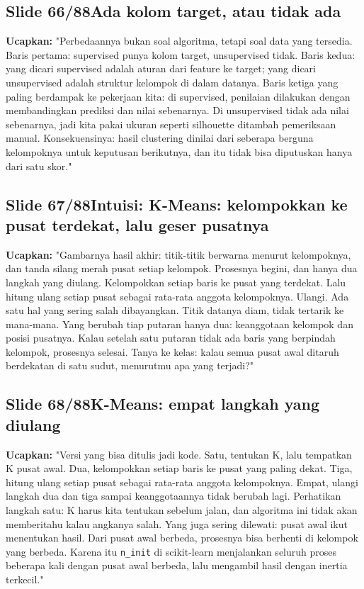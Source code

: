 \documentclass[11pt]{article}
\renewcommand{\framebox}[1]{\colorbox{acc!15}{\textcolor{acc}{\textbf{#1}}}}
\begin{document}
\subsection*{\framebox{Slide 66/88}\quad Ada kolom target, atau tidak ada}
\textbf{Ucapkan:} "Perbedaannya bukan soal algoritma, tetapi soal data yang tersedia. Baris pertama: supervised punya kolom target, unsupervised tidak. Baris kedua: yang dicari supervised adalah aturan dari feature ke target; yang dicari unsupervised adalah struktur kelompok di dalam datanya. Baris ketiga yang paling berdampak ke pekerjaan kita: di supervised, penilaian dilakukan dengan membandingkan prediksi dan nilai sebenarnya. Di unsupervised tidak ada nilai sebenarnya, jadi kita pakai ukuran seperti silhouette ditambah pemeriksaan manual. Konsekuensinya: hasil clustering dinilai dari seberapa berguna kelompoknya untuk keputusan berikutnya, dan itu tidak bisa diputuskan hanya dari satu skor."\\[2pt]

\subsection*{\framebox{Slide 67/88}\quad Intuisi: K-Means: kelompokkan ke pusat terdekat, lalu geser pusatnya}
\textbf{Ucapkan:} "Gambarnya hasil akhir: titik-titik berwarna menurut kelompoknya, dan tanda silang merah pusat setiap kelompok. Prosesnya begini, dan hanya dua langkah yang diulang. Kelompokkan setiap baris ke pusat yang terdekat. Lalu hitung ulang setiap pusat sebagai rata-rata anggota kelompoknya. Ulangi. Ada satu hal yang sering salah dibayangkan. Titik datanya diam, tidak tertarik ke mana-mana. Yang berubah tiap putaran hanya dua: keanggotaan kelompok dan posisi pusatnya. Kalau setelah satu putaran tidak ada baris yang berpindah kelompok, prosesnya selesai. Tanya ke kelas: kalau semua pusat awal ditaruh berdekatan di satu sudut, menurutmu apa yang terjadi?"\\[2pt]

\subsection*{\framebox{Slide 68/88}\quad K-Means: empat langkah yang diulang}
\textbf{Ucapkan:} "Versi yang bisa ditulis jadi kode. Satu, tentukan K, lalu tempatkan K pusat awal. Dua, kelompokkan setiap baris ke pusat yang paling dekat. Tiga, hitung ulang setiap pusat sebagai rata-rata anggota kelompoknya. Empat, ulangi langkah dua dan tiga sampai keanggotaannya tidak berubah lagi. Perhatikan langkah satu: K harus kita tentukan sebelum jalan, dan algoritma ini tidak akan memberitahu kalau angkanya salah. Yang juga sering dilewati: pusat awal ikut menentukan hasil. Dari pusat awal berbeda, prosesnya bisa berhenti di kelompok yang berbeda. Karena itu \texttt{n\_init} di scikit-learn menjalankan seluruh proses beberapa kali dengan pusat awal berbeda, lalu mengambil hasil dengan inertia terkecil."\\[2pt]
\end{document}
